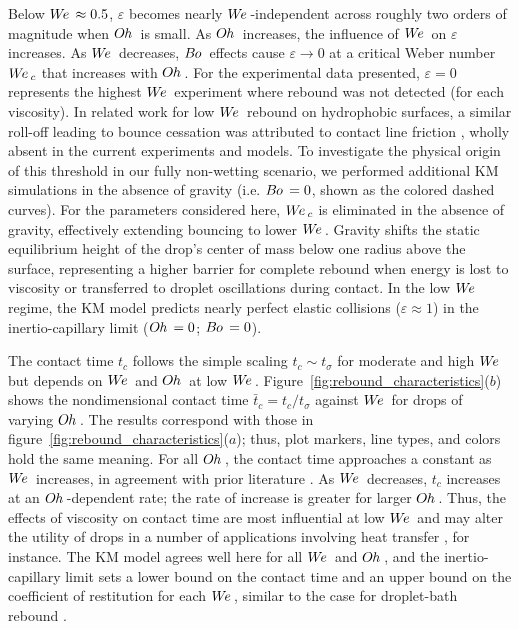 \documentclass{jfm}
\newcommand{\We}{W\kern-0.15em e\,}
\newcommand{\Bo}{B\kern-0.05em o\,}
\newcommand{\Oh}{O\kern-0.05em h\,}
\begin{document}
Below $\We \approx 0.5$, $\varepsilon$ becomes nearly $\We$-independent across roughly two orders of magnitude when $\Oh$ is small. As $\Oh$ increases, the influence of $\We$ on $\varepsilon$ increases. As $\We$ decreases, $\Bo$ effects cause $\varepsilon \rightarrow 0$ at a critical Weber number $\We_c$ that increases with $\Oh$. For the experimental data presented, $\varepsilon = 0$ represents the highest $\We$ experiment where rebound was not detected (for each viscosity). In related work for low $\We$ rebound on hydrophobic surfaces, a similar roll-off leading to bounce cessation was attributed to contact line friction \citep{wang2022successive,thenarianto2023energy}, wholly absent in the current experiments and models. To investigate the physical origin of this threshold in our fully non-wetting scenario, we performed additional KM simulations in the absence of gravity (i.e. $\Bo=0$, shown as the colored dashed curves).  For the parameters considered here, $\We_c$ is eliminated in the absence of gravity, effectively extending bouncing to lower $\We$. Gravity shifts the static equilibrium height of the drop's center of mass below one radius above the surface, representing a higher barrier for complete rebound when energy is lost to viscosity or transferred to droplet oscillations during contact.  In the low $\We$ regime, the KM model predicts nearly perfect elastic collisions ($\varepsilon\approx 1$) in the inertio-capillary limit ($\Oh=0$; $\Bo=0$).


The contact time $t_c$ follows the simple scaling $t_{c} \sim t_{\sigma}$ for moderate and high $\We$ \citep{richard2002contact} but depends on $\We$ and $\Oh$ at low $\We$. Figure~\ref{fig:rebound_characteristics}($b$) shows the nondimensional contact time $\bar{t}_{c} = t_{c} / t_{\sigma}$ against $\We$ for drops of varying $\Oh$. The results correspond with those in figure~\ref{fig:rebound_characteristics}($a$); thus, plot markers, line types, and colors hold the same meaning. For all $\Oh$, the contact time approaches a constant as $\We$ increases, in agreement with prior literature \citep{okumura2003water}. As $\We$ decreases, $t_c$ increases at an $\Oh$-dependent rate; the rate of increase is greater for larger $\Oh$. Thus, the effects of viscosity on contact time are most influential at low $\We$ and may alter the utility of drops in a number of applications involving heat transfer \citep{shiri2017heat}, for instance. The KM model agrees well here for all $\We$ and $\Oh$, and the inertio-capillary limit sets a lower bound on the contact time and an upper bound on the coefficient of restitution for each $\We$, similar to the case for droplet-bath rebound \citep{alventosa2023inertio}.
\end{document}
